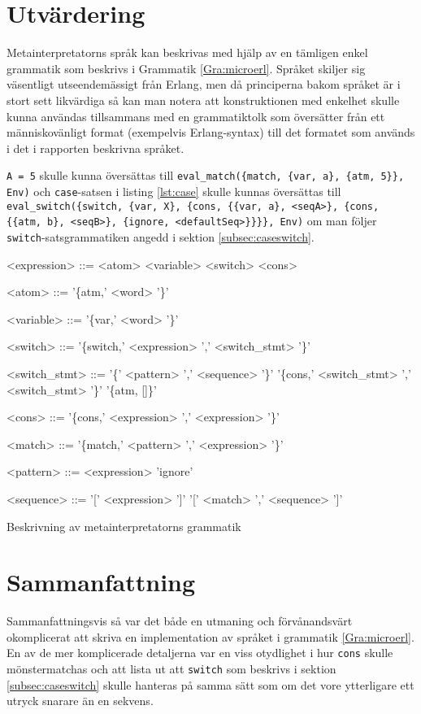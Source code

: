 \documentclass[a4paper, 11pt]{article}
\begin{document}
\section{Utvärdering}

Metainterpretatorns språk kan beskrivas med hjälp av en tämligen enkel grammatik som beskrivs i Grammatik \ref{Gra:microerl}. Språket skiljer sig väsentligt utseendemässigt från Erlang, men då principerna bakom språket är i stort sett likvärdiga så kan man notera att konstruktionen med enkelhet skulle kunna användas tillsammans med en grammatiktolk som översätter från ett människovänligt format (exempelvis Erlang-syntax) till det formatet som används i det i rapporten beskrivna språket.

\lstinline$A = 5$ skulle kunna översättas till \lstinline$eval_match({match, {var, a}, {atm, 5}}, Env)$ och \texttt{case}-satsen i listing \ref{lst:case} skulle kunnas översättas till \lstinline$eval_switch({switch, {var, X}, {cons, {{var, a}, <seqA>}, {cons, {{atm, b}, <seqB>}, {ignore, <defaultSeq>}}}}, Env)$ om man följer \texttt{switch}-satsgrammatiken angedd i sektion \ref{subsec:caseswitch}.

\begin{Grammar}
\begin{grammar}
<expression> ::= <atom>
\alt <variable>
\alt <switch>
\alt <cons>

<atom> ::= '\{atm,' <word> '\}'

<variable> ::= '\{var,' <word> '\}'

<switch> ::= '\{switch,' <expression> ',' <switch_stmt> '\}'

<switch_stmt> ::= '\{' <pattern> ',' <sequence> '\}'
\alt '\{cons,' <switch_stmt> ',' <switch_stmt> '\}'
\alt '\{atm, []\}'

<cons> ::= '\{cons,' <expression> ',' <expression> '\}'

<match> ::= '\{match,' <pattern> ',' <expression> '\}'

<pattern> ::= <expression>
\alt 'ignore'

<sequence> ::= '[' <expression> ']'
	\alt '[' <match> ',' <sequence> ']'
\end{grammar}
\caption{Beskrivning av metainterpretatorns grammatik}
\label{Gra:microerl}
\end{Grammar}

\section{Sammanfattning}
Sammanfattningsvis så var det både en utmaning och förvånandsvärt okomplicerat att skriva en implementation av språket i grammatik \ref{Gra:microerl}. En av de mer komplicerade detaljerna var en viss otydlighet i hur \texttt{cons} skulle mönstermatchas och att lista ut att \texttt{switch} som beskrivs i sektion \ref{subsec:caseswitch} skulle hanteras på samma sätt som om det vore ytterligare ett utryck snarare än en sekvens.
\end{document}
